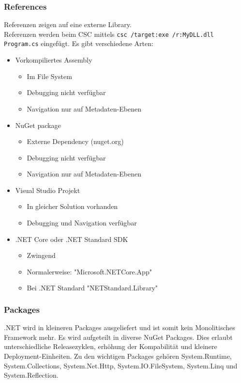 \documentclass[
a4paper,
oneside,
10pt,
fleqn,
headsepline,
toc=listofnumbered, 
bibliography=totocnumbered]{scrartcl}
\begin{document}
\subsubsection{References}
Referenzen zeigen auf eine externe Library. \\
Referenzen werden beim CSC mittels \lstinline|csc /target:exe /r:MyDLL.dll Program.cs| eingefügt. Es gibt verschiedene Arten:
\begin{itemize}
	\item Vorkompiliertes Assembly
	      \begin{itemize}
		      \item Im File System
		      \item Debugging nicht verfügbar
		      \item Navigation nur auf Metadaten-Ebenen
	      \end{itemize}
	\item NuGet package
	      \begin{itemize}
		      \item Externe Dependency (nuget.org)
		      \item Debugging nicht verfügbar
		      \item Navigation nur auf Metadaten-Ebenen
	      \end{itemize}
	\item Visual Studio Projekt
	      \begin{itemize}
		      \item In gleicher Solution vorhanden
		      \item Debugging und Navigation verfügbar
	      \end{itemize}
	\item .NET Core oder .NET Standard SDK
	      \begin{itemize}
		      \item Zwingend
		      \item Normalerweise: "Microsoft.NETCore.App"
		      \item Bei .NET Standard "NETStandard.Library"
	      \end{itemize}
\end{itemize}

\subsubsection{Packages}
.NET wird in kleineren Packages ausgeliefert und ist somit kein Monolitisches Framework mehr. Es wird aufgeteilt in diverse NuGet Packages. Dies erlaubt unterschiedliche Releasezyklen, erhöhung der Kompabilität und kleinere Deployment-Einheiten. Zu den wichtigen Packages gehören System.Runtime, System.Collections, System.Net.Http, System.IO.FileSystem, System.Linq und System.Reflection.
\end{document}

